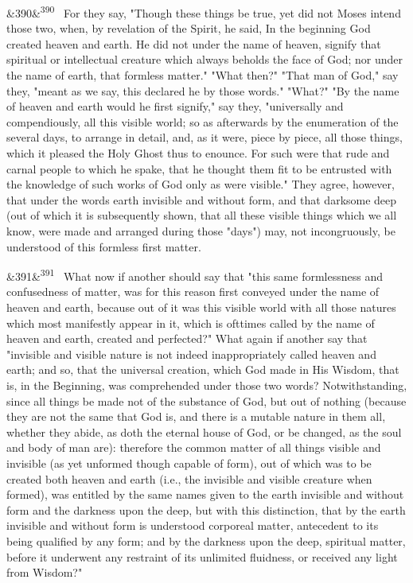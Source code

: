 \documentclass[12pt]{article}
\newcommand{\para}[1][]{\par\noindent\ifx&#1&\else\textsuperscript{\footnotesize #1}~\fi}
\begin{document}
\para[390] For they say, "Though these things be true, yet did not Moses intend those two, when, by revelation of the Spirit, he said, In the beginning God created heaven and earth. He did not under the name of heaven, signify that spiritual or intellectual creature which always beholds the face of God; nor under the name of earth, that formless matter." "What then?" "That man of God," say they, "meant as we say, this declared he by those words." "What?" "By the name of heaven and earth would he first signify," say they, "universally and compendiously, all this visible world; so as afterwards by the enumeration of the several days, to arrange in detail, and, as it were, piece by piece, all those things, which it pleased the Holy Ghost thus to enounce. For such were that rude and carnal people to which he spake, that he thought them fit to be entrusted with the knowledge of such works of God only as were visible." They agree, however, that under the words earth invisible and without form, and that darksome deep (out of which it is subsequently shown, that all these visible things which we all know, were made and arranged during those "days") may, not incongruously, be understood of this formless first matter.

\para[391] What now if another should say that "this same formlessness and confusedness of matter, was for this reason first conveyed under the name of heaven and earth, because out of it was this visible world with all those natures which most manifestly appear in it, which is ofttimes called by the name of heaven and earth, created and perfected?" What again if another say that "invisible and visible nature is not indeed inappropriately called heaven and earth; and so, that the universal creation, which God made in His Wisdom, that is, in the Beginning, was comprehended under those two words? Notwithstanding, since all things be made not of the substance of God, but out of nothing (because they are not the same that God is, and there is a mutable nature in them all, whether they abide, as doth the eternal house of God, or be changed, as the soul and body of man are): therefore the common matter of all things visible and invisible (as yet unformed though capable of form), out of which was to be created both heaven and earth (i.e., the invisible and visible creature when formed), was entitled by the same names given to the earth invisible and without form and the darkness upon the deep, but with this distinction, that by the earth invisible and without form is understood corporeal matter, antecedent to its being qualified by any form; and by the darkness upon the deep, spiritual matter, before it underwent any restraint of its unlimited fluidness, or received any light from Wisdom?"
\end{document}
